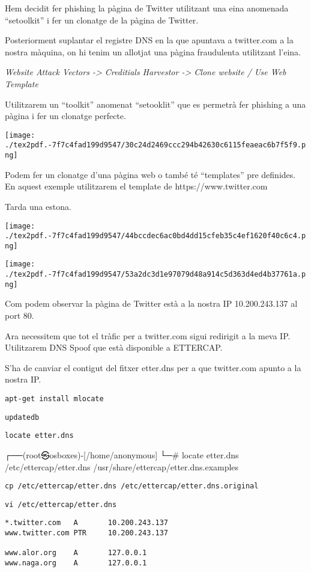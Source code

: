 \documentclass[]{article}
\begin{document}
Hem decidit fer phishing la pàgina de Twitter utilitzant una eina
anomenada ``setoolkit'' i fer un clonatge de la pàgina de Twitter.

Posteriorment suplantar el registre DNS en la que apuntava a twitter.com
a la nostra màquina, on hi tenim un allotjat una pàgina fraudulenta
utilitzant l'eina.

\emph{Website Attack Vectors -\textgreater{} Creditials Harvestor
-\textgreater{} Clone website / Use Web Template}

Utilitzarem un ``toolkit'' anomenat ``setooklit'' que es permetrà fer
phishing a una pàgina i fer un clonatge perfecte.

\texttt{[image: ./tex2pdf.-7f7c4fad199d9547/30c24d2469ccc294b42630c6115feaeac6b7f5f9.png]}

Podem fer un clonatge d'una pàgina web o també té ``templates'' pre
definides. En aquest exemple utilitzarem el template de
https://www.twitter.com

Tarda una estona.

\texttt{[image: ./tex2pdf.-7f7c4fad199d9547/44bccdec6ac0bd4dd15cfeb35c4ef1620f40c6c4.png]}

\texttt{[image: ./tex2pdf.-7f7c4fad199d9547/53a2dc3d1e97079d48a914c5d363d4ed4b37761a.png]}

Com podem observar la pàgina de Twitter està a la nostra IP
10.200.243.137 al port 80.

Ara necessitem que tot el tràfic per a twitter.com sigui redirigit a la
meva IP. Utilitzarem DNS Spoof que està disponible a ETTERCAP.

S'ha de canviar el contigut del fitxer etter.dns per a que twitter.com
apunto a la nostra IP.

\texttt{apt-get\ install\ mlocate}

\texttt{updatedb}

\texttt{locate\ etter.dns}

┌──(root㉿osboxes)-{[}/home/anonymous{]} └─\# locate etter.dns
/etc/ettercap/etter.dns /usr/share/ettercap/etter.dns.examples

\texttt{cp\ /etc/ettercap/etter.dns\ /etc/ettercap/etter.dns.original}

\texttt{vi\ /etc/ettercap/etter.dns}

\begin{verbatim}
*.twitter.com   A       10.200.243.137
www.twitter.com PTR     10.200.243.137

www.alor.org    A       127.0.0.1
www.naga.org    A       127.0.0.1
\end{verbatim}
\end{document}
